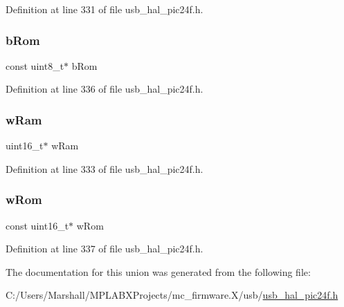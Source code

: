 Definition at line 331 of file usb\+\_\+hal\+\_\+pic24f.\+h.

\mbox{\label{union___p_o_i_n_t_e_r_ad199f0db405ddec97c0679ba019934e7}} 
\subsubsection{\texorpdfstring{bRom}{bRom}}
{\footnotesize\ttfamily const uint8\+\_\+t$\ast$ b\+Rom}



Definition at line 336 of file usb\+\_\+hal\+\_\+pic24f.\+h.

\mbox{\label{union___p_o_i_n_t_e_r_a7fbff1cee75fe5bc810c6872b4f7f2e7}} 
\subsubsection{\texorpdfstring{wRam}{wRam}}
{\footnotesize\ttfamily uint16\+\_\+t$\ast$ w\+Ram}



Definition at line 333 of file usb\+\_\+hal\+\_\+pic24f.\+h.

\mbox{\label{union___p_o_i_n_t_e_r_a6fd9e98c13e3aa04654f2c5ffd7e758f}} 
\subsubsection{\texorpdfstring{wRom}{wRom}}
{\footnotesize\ttfamily const uint16\+\_\+t$\ast$ w\+Rom}



Definition at line 337 of file usb\+\_\+hal\+\_\+pic24f.\+h.



The documentation for this union was generated from the following file\+:\begin{DoxyCompactItemize}
\item 
C\+:/\+Users/\+Marshall/\+M\+P\+L\+A\+B\+X\+Projects/mc\+\_\+firmware.\+X/usb/\mbox{\hyperlink{usb__hal__pic24f_8h}{usb\+\_\+hal\+\_\+pic24f.\+h}}\end{DoxyCompactItemize}
